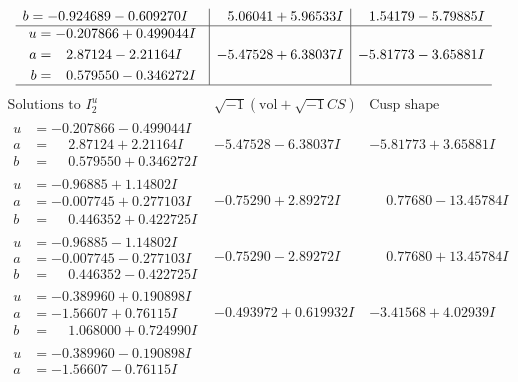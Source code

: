 \documentclass[1p]{elsarticle_modified}
\theoremstyle{definition}
\newcommand{\I}{\sqrt{-1}}
\begin{document}
$$\begin{array}{c|c|c}
\begin{aligned}
b &= -0.924689 - 0.609270 I\end{aligned}
 & \phantom{-}5.06041 + 5.96533 I & \phantom{-}1.54179 - 5.79885 I \\ \hline\begin{aligned}
u &= -0.207866 + 0.499044 I \\
a &= \phantom{-}2.87124 - 2.21164 I \\
b &= \phantom{-}0.579550 - 0.346272 I\end{aligned}
 & -5.47528 + 6.38037 I & -5.81773 - 3.65881 I\\
 \hline 
 \end{array}$$\newpage$$\begin{array}{c|c|c}  
\text{Solutions to }I^u_{2}& \I (\text{vol} + \sqrt{-1}CS) & \text{Cusp shape}\\
 \hline 
\begin{aligned}
u &= -0.207866 - 0.499044 I \\
a &= \phantom{-}2.87124 + 2.21164 I \\
b &= \phantom{-}0.579550 + 0.346272 I\end{aligned}
 & -5.47528 - 6.38037 I & -5.81773 + 3.65881 I \\ \hline\begin{aligned}
u &= -0.96885 + 1.14802 I \\
a &= -0.007745 + 0.277103 I \\
b &= \phantom{-}0.446352 + 0.422725 I\end{aligned}
 & -0.75290 + 2.89272 I & \phantom{-}0.77680 - 13.45784 I \\ \hline\begin{aligned}
u &= -0.96885 - 1.14802 I \\
a &= -0.007745 - 0.277103 I \\
b &= \phantom{-}0.446352 - 0.422725 I\end{aligned}
 & -0.75290 - 2.89272 I & \phantom{-}0.77680 + 13.45784 I \\ \hline\begin{aligned}
u &= -0.389960 + 0.190898 I \\
a &= -1.56607 + 0.76115 I \\
b &= \phantom{-}1.068000 + 0.724990 I\end{aligned}
 & -0.493972 + 0.619932 I & -3.41568 + 4.02939 I \\ \hline\begin{aligned}
u &= -0.389960 - 0.190898 I \\
a &= -1.56607 - 0.76115 I \\

\end{aligned}
\end{array}$$
\end{document}
